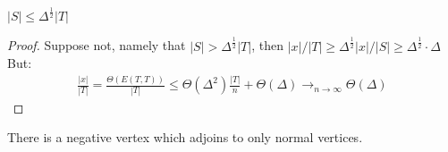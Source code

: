 \begin{claim}
  $ |S| \le \Delta^{\frac{1}{2}}|T| $ 
\end{claim}
\begin{proof}
Suppose not, namely that $|S| > \Delta^{\frac{1}{2}}|T|$, then $|x|/|T| \ge \Delta^{\frac{1}{2}}|x|/|S| \ge \Delta^{\frac{1}{2}} \cdot \Delta $ But:  
\begin{equation*}
  \begin{split}
    \frac{|x|}{|T|} = \frac{\Theta \left(E(T,T) \right)}{|T|} \le \Theta(\Delta^{2})\frac{|T|}{n}  + \Theta(\Delta)  \rightarrow_{n\rightarrow \infty} \Theta(\Delta)
  \end{split}
\end{equation*}
\end{proof}
\begin{claim}
  There is a negative vertex which adjoins to only normal vertices. 
\end{claim}
